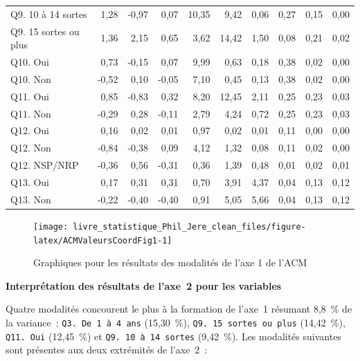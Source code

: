 \documentclass[
  11pt,
  french,
]{book}
\begin{document}
\begin{table}
\begin{tabular}[t]{lrrrrrrrrr}
Q9. 10 à 14 sortes & 1,28 & -0,97 & 0,07 & 10,35 & 9,42 & 0,06 & 0,27 & 0,15 & 0,00\\
\addlinespace
Q9. 15 sortes ou plus & 1,36 & 2,15 & 0,65 & 3,62 & 14,42 & 1,50 & 0,08 & 0,21 & 0,02\\
Q10. Oui & 0,73 & -0,15 & 0,07 & 9,99 & 0,63 & 0,18 & 0,38 & 0,02 & 0,00\\
Q10. Non & -0,52 & 0,10 & -0,05 & 7,10 & 0,45 & 0,13 & 0,38 & 0,02 & 0,00\\
Q11. Oui & 0,85 & -0,83 & 0,32 & 8,20 & 12,45 & 2,11 & 0,25 & 0,23 & 0,03\\
Q11. Non & -0,29 & 0,28 & -0,11 & 2,79 & 4,24 & 0,72 & 0,25 & 0,23 & 0,03\\
\addlinespace
Q12. Oui & 0,16 & 0,02 & 0,01 & 0,97 & 0,02 & 0,01 & 0,11 & 0,00 & 0,00\\
Q12. Non & -0,84 & -0,38 & 0,09 & 4,12 & 1,32 & 0,08 & 0,11 & 0,02 & 0,00\\
Q12. NSP/NRP & -0,36 & 0,56 & -0,31 & 0,36 & 1,39 & 0,48 & 0,01 & 0,02 & 0,01\\
Q13. Oui & 0,17 & 0,31 & 0,31 & 0,70 & 3,91 & 4,37 & 0,04 & 0,13 & 0,12\\
Q13. Non & -0,22 & -0,40 & -0,40 & 0,91 & 5,05 & 5,66 & 0,04 & 0,13 & 0,12\\
\bottomrule
\end{tabular}
\end{table}

\begin{figure}

{\centering \texttt{[image: livre\_statistique\_Phil\_Jere\_clean\_files/figure-latex/ACMValeursCoordFig1-1]} 

}

\caption{Graphiques pour les résultats des modalités de l'axe 1 de l'ACM}\label{fig:ACMValeursCoordFig1}
\end{figure}

\textbf{Interprétation des résultats de l'axe~2 pour les variables}

Quatre modalités concourent le plus à la formation de l'axe~1 résumant 8,8~\% de la variance~: \texttt{Q3.\ De\ 1\ à\ 4\ ans} (15,30~\%), \texttt{Q9.\ 15\ sortes\ ou\ plus} (14,42~\%), \texttt{Q11.\ Oui} (12,45~\%) et \texttt{Q9.\ 10\ à\ 14\ sortes} (9,42~\%). Les modalités suivantes sont présentes aux deux extrémités de l'axe~2~:
\end{document}
